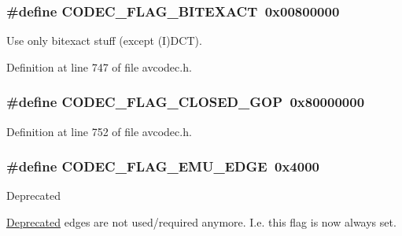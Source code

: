 \subsubsection[{\texorpdfstring{C\+O\+D\+E\+C\+\_\+\+F\+L\+A\+G\+\_\+\+B\+I\+T\+E\+X\+A\+CT}{CODEC_FLAG_BITEXACT}}]{\setlength{\rightskip}{0pt plus 5cm}\#define C\+O\+D\+E\+C\+\_\+\+F\+L\+A\+G\+\_\+\+B\+I\+T\+E\+X\+A\+CT~0x00800000}\hypertarget{group__lavc__core_ga7e93ca818d7baf38a9ba521cbdc76ae7}{}\label{group__lavc__core_ga7e93ca818d7baf38a9ba521cbdc76ae7}


Use only bitexact stuff (except (I)D\+CT). 



Definition at line 747 of file avcodec.\+h.

\subsubsection[{\texorpdfstring{C\+O\+D\+E\+C\+\_\+\+F\+L\+A\+G\+\_\+\+C\+L\+O\+S\+E\+D\+\_\+\+G\+OP}{CODEC_FLAG_CLOSED_GOP}}]{\setlength{\rightskip}{0pt plus 5cm}\#define C\+O\+D\+E\+C\+\_\+\+F\+L\+A\+G\+\_\+\+C\+L\+O\+S\+E\+D\+\_\+\+G\+OP~0x80000000}\hypertarget{group__lavc__core_ga548edd4e22e6f853630f08a0f18f4506}{}\label{group__lavc__core_ga548edd4e22e6f853630f08a0f18f4506}


Definition at line 752 of file avcodec.\+h.

\subsubsection[{\texorpdfstring{C\+O\+D\+E\+C\+\_\+\+F\+L\+A\+G\+\_\+\+E\+M\+U\+\_\+\+E\+D\+GE}{CODEC_FLAG_EMU_EDGE}}]{\setlength{\rightskip}{0pt plus 5cm}\#define C\+O\+D\+E\+C\+\_\+\+F\+L\+A\+G\+\_\+\+E\+M\+U\+\_\+\+E\+D\+GE~0x4000}\hypertarget{group__lavc__core_ga59f363ca5d22ad82adab3a5e6f520d10}{}\label{group__lavc__core_ga59f363ca5d22ad82adab3a5e6f520d10}
\begin{DoxyRefDesc}{Deprecated}
\item[\hyperlink{deprecated__deprecated000002}{Deprecated}]edges are not used/required anymore. I.\+e. this flag is now always set. \end{DoxyRefDesc}


